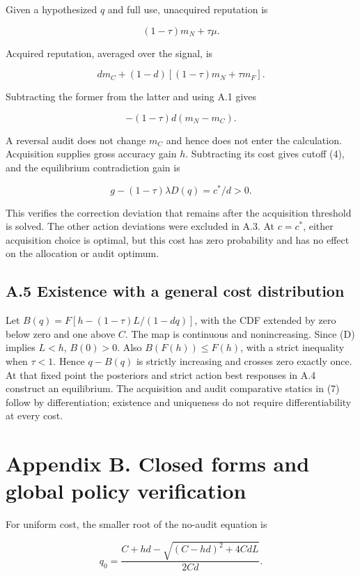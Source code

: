 \documentclass[
  11pt,
]{article}
\begin{document}
Given a hypothesized \(q\) and full use, unacquired reputation is

\[(1-\tau)m_N+\tau\mu.\]

Acquired reputation, averaged over the signal, is

\[dm_C+(1-d)[(1-\tau)m_N+\tau m_F].\]

Subtracting the former from the latter and using A.1 gives

\[-(1-\tau)d(m_N-m_C).\]

A reversal audit does not change \(m_C\) and hence does not enter the
calculation. Acquisition supplies gross accuracy gain \(h\). Subtracting
its cost gives cutoff (4), and the equilibrium contradiction gain is

\[g-(1-\tau)\lambda D(q)=c^*/d>0.\]

This verifies the correction deviation that remains after the
acquisition threshold is solved. The other action deviations were
excluded in A.3. At \(c=c^*\), either acquisition choice is optimal, but
this cost has zero probability and has no effect on the allocation or
audit optimum.

\subsection{A.5 Existence with a general cost
distribution}\label{a.5-existence-with-a-general-cost-distribution}

Let \(B(q)=F[h-(1-\tau)L/(1-dq)]\), with the CDF extended by zero below
zero and one above \(C\). The map is continuous and nonincreasing. Since
(D) implies \(L<h\), \(B(0)>0\). Also \(B(F(h))\leq F(h)\), with a
strict inequality when \(\tau<1\). Hence \(q-B(q)\) is strictly
increasing and crosses zero exactly once. At that fixed point the
posteriors and strict action best responses in A.4 construct an
equilibrium. The acquisition and audit comparative statics in (7) follow
by differentiation; existence and uniqueness do not require
differentiability at every cost.

\section{Appendix B. Closed forms and global policy
verification}\label{appendix-b.-closed-forms-and-global-policy-verification}

For uniform cost, the smaller root of the no-audit equation is

\[q_0=\frac{C+hd-\sqrt{(C-hd)^2+4CdL}}{2Cd}.\]
\end{document}
